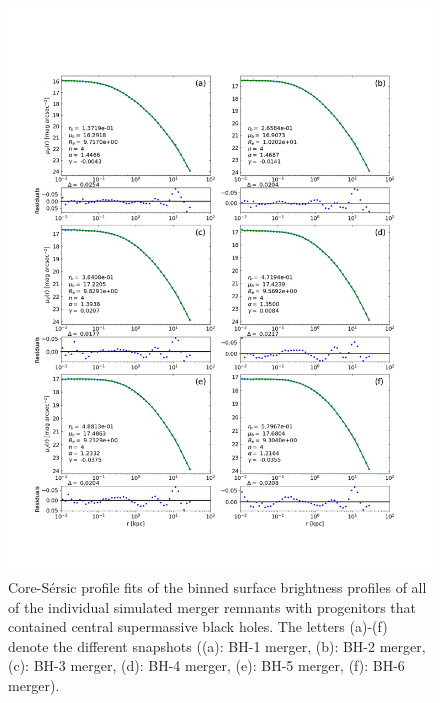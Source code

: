 \documentclass[english, twoside]{HYgradu}
\begin{document}
\begin{figure}
	\centering
	\includegraphics[width=\textwidth]{all_core_profiles.png}
	\caption{Core-Sérsic profile fits of the binned surface brightness profiles of all of the individual simulated merger remnants with progenitors that contained central supermassive black holes. The letters (a)-(f) denote the different snapshots ((a): BH-1 merger, (b): BH-2 merger, (c): BH-3 merger, (d): BH-4 merger, (e): BH-5 merger, (f): BH-6 merger).}
	\label{figure:all_core}
\end{figure}
\end{document}
